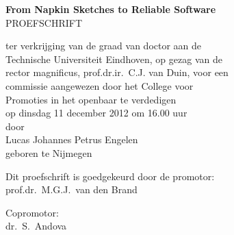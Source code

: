 \begin{titlepage}
\begin{center}
{\Large \textbf{From Napkin Sketches to Reliable Software} }\\
\vspace*{1.5cm}
{\Large \uppercase{proefschrift}}

\vspace*{1.5cm}

ter verkrijging van de graad van doctor aan de\\
Technische Universiteit Eindhoven, op gezag van de\\
rector magnificus, prof.dr.ir.\ C.J. van Duin,
voor een\\ commissie aangewezen door het College voor\\
Promoties in het openbaar te verdedigen\\
op dinsdag 11 december 2012 om 16.00 uur\\
\vspace*{0.5cm}
door\\

\vspace*{0.5cm}
Lucas Johannes Petrus Engelen\\

\vspace*{0.5cm}
geboren te Nijmegen
\end{center}

\newpage
\thispagestyle{empty}
\noindent
Dit proefschrift is goedgekeurd door de promotor:\\[2ex]
prof.dr.\ M.G.J.\ van den Brand

\vspace*{1cm}
\noindent
Copromotor:\\
dr.\ S.\ Andova
\end{titlepage} 